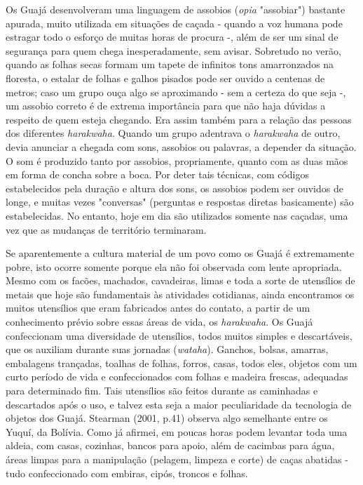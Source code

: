 Os Guajá desenvolveram uma linguagem de assobios (\emph{opia}
"assobiar") bastante apurada, muito utilizada em situações de caçada -
quando a voz humana pode estragar todo o esforço de muitas horas de
procura -, além de ser um sinal de segurança para quem chega
inesperadamente, sem avisar. Sobretudo no verão, quando as folhas secas
formam um tapete de infinitos tons amarronzados na floresta, o estalar
de folhas e galhos pisados pode ser ouvido a centenas de metros; caso um
grupo ouça algo se aproximando - sem a certeza do que seja -, um assobio
correto é de extrema importância para que não haja dúvidas a respeito de
quem esteja chegando. Era assim também para a relação das pessoas dos
diferentes \emph{harakwaha}. Quando um grupo adentrava o
\emph{harakwaha} de outro, devia anunciar a chegada com sons, assobios
ou palavras, a depender da situação. O som é produzido tanto por
assobios, propriamente, quanto com as duas mãos em forma de concha sobre
a boca. Por deter tais técnicas, com códigos estabelecidos pela duração
e altura dos sons, os assobios podem ser ouvidos de longe, e muitas
vezes "conversas" (perguntas e respostas diretas basicamente) são
estabelecidas. No entanto, hoje em dia são utilizados somente nas
caçadas, uma vez que as mudanças de território terminaram.

Se aparentemente a cultura material de um povo como os Guajá é
extremamente pobre, isto ocorre somente porque ela não foi observada com
lente apropriada. Mesmo com os facões, machados, cavadeiras, limas e
toda a sorte de utensílios de metais que hoje são fundamentais às
atividades cotidianas, ainda encontramos os muitos utensílios que eram
fabricados antes do contato, a partir de um conhecimento prévio sobre
essas áreas de vida, os \emph{harakwaha}. Os Guajá confeccionam uma
diversidade de utensílios, todos muitos simples e descartáveis, que os
auxiliam durante suas jornadas (\emph{wataha}). Ganchos, bolsas,
amarras, embalagens trançadas, toalhas de folhas, forros, casas, todos
eles, objetos com um curto período de vida e confeccionados com folhas e
madeira frescas, adequadas para determinado fim. Tais utensílios são
feitos durante as caminhadas e descartados após o uso, e talvez esta
seja a maior peculiaridade da tecnologia de objetos dos Guajá. Stearman
(2001, p.41) observa algo semelhante entre os Yuquí, da Bolívia. Como já
afirmei, em poucas horas podem levantar toda uma aldeia, com casas,
cozinhas, bancos para apoio, além de cacimbas para água, áreas limpas
para a manipulação (pelagem, limpeza e corte) de caças abatidas - tudo
confeccionado com embiras, cipós, troncos e folhas.

